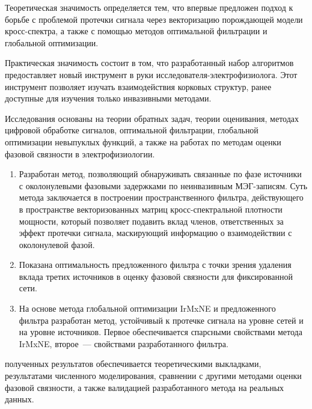 {\influence}
Теоретическая значимость определяется тем, что
впервые предложен подход к борьбе с проблемой протечки
сигнала через векторизацию порождающей модели кросс-спектра,
а также с помощью методов оптимальной фильтрации и глобальной оптимизации.

Практическая значимость состоит в том, что разработанный набор алгоритмов
предоставляет новый инструмент в руки исследователя-электрофизиолога. Этот
инструмент позволяет изучать взаимодействия корковых структур, ранее
доступные для изучения только инвазивными методами.

{\methods}
Исследования основаны на теории обратных задач, теории оценивания,
методах цифровой обработке сигналов, оптимальной фильтрации,
глобальной оптимизации невыпуклых функций, а также на работах
по методам оценки фазовой связности в электрофизиологии.

{}
\begin{enumerate}
  \item Разработан метод, позволяющий обнаруживать связанные по фазе источники с околонулевыми фазовыми задержками
      по неинвазивным МЭГ-записям. Суть метода заключается в построении пространственного фильтра,
      действующего в пространстве векторизованных матриц кросс-спектральной плотности мощности,
      который позволяет подавить вклад членов, ответственных за эффект протечки сигнала, маскирующий
      информацию о взаимодействии с околонулевой фазой.
  \item Показана оптимальность предложенного фильтра с точки зрения удаления вклада третих источников
      в оценку фазовой связности для фиксированной сети.
  \item На основе метода глобальной оптимизации IrMxNE и предложенного фильтра разработан метод,
      устойчивый к протечке сигнала на уровне сетей и на уровне источников. Первое обеспечивается
      спарсными свойствами метода IrMxNE, второе~--- свойствами разработанного фильтра.
\end{enumerate}

{\reliability} полученных результатов обеспечивается теоретическими выкладками, результатами численного моделирования,
сравнении с другими методами оценки фазовой связности, а также
валидацией разработанного метода на реальных данных.

{\probation}

